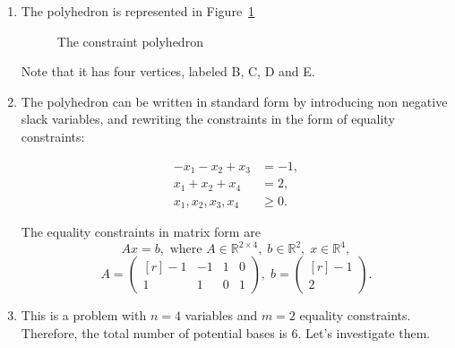 
\begin{enumerate}

\item The polyhedron is represented in  Figure~\ref{fig:poly}

  \begin{figure}[htb]
  \begin{center}
  \end{center}
  \caption{\label{fig:poly}The constraint polyhedron}
  \end{figure}
  Note that it has four vertices, labeled B, C, D and E.
  
\item
The polyhedron can be written in standard form by introducing non
negative slack variables, and rewriting the constraints in the form of equality constraints:

\begin{align*}
-x_1-x_2+x_3 & =-1,\\
x_1+x_2+x_4 &=2,\\
x_1,x_2,x_3,x_4 & \geq 0.
\end{align*}

The equality constraints in matrix form are
\[
Ax= b,
\text{ where }
 A \in \mathbb{R}^{2\times 4},\; b \in \mathbb{R}^2,\; x \in \mathbb{R}^4,
\]
\[
A =
\begin{pmatrix*}[r]
-1&-1&1&0\\
1&1&0&1
\end{pmatrix*},\;
b =
\begin{pmatrix*}[r]
-1\\
2
\end{pmatrix*}.
\]

\item
This is a problem with $n=4$ variables and $m=2$ equality
constraints. Therefore, the total number of potential bases is 6. 
Let's investigate them.


\end{enumerate}
